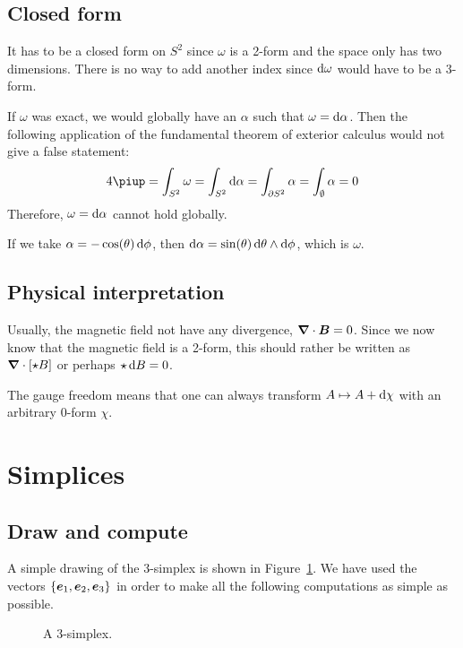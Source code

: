 \documentclass[11pt, english, fleqn, DIV=15, headinclude, BCOR=1cm]{scrartcl}
\begin{document}
\subsection{Closed form}

It has to be a closed form on $S^2$ since $\omega$ is a 2-form and the space
only has two dimensions. There is no way to add another index since $\mathop{}\!\mathrm d
\omega$ would have to be a 3-form.

If $\omega$ was exact, we would globally have an $\alpha$ such that $\omega =
\mathop{}\!\mathrm d\alpha$. Then the following application of the fundamental theorem of
exterior calculus would not give a false statement:
\[
    4 \piup = \int_{S^2} \omega = \int_{S^2} \dif \alpha = \int_{\partial S^2}
    \alpha = \int_\emptyset \alpha = 0
\]
Therefore, $\omega = \mathop{}\!\mathrm d\alpha$ cannot hold globally.

If we take $\alpha = - \cos(\theta) \mathop{}\!\mathrm d \phi$, then $\mathop{}\!\mathrm d \alpha =
\sin(\theta) \mathop{}\!\mathrm d \theta \wedge \mathop{}\!\mathrm d \phi$, which is $\omega$.

\subsection{Physical interpretation}

Usually, the magnetic field not have any divergence, $\boldsymbol{\nabla} \cdot \boldsymbol{B} =
0$. Since we now know that the magnetic field is a 2-form, this should rather
be written as $\boldsymbol{\nabla} \cdot [\star B]$ or perhaps $\star \mathop{}\!\mathrm d B = 0$.

The gauge freedom means that one can always transform $A \mapsto A + \mathop{}\!\mathrm d \chi$
with an arbitrary 0-form $\chi$.

\section{Simplices}
\label{homework:3}

\subsection{Draw and compute}

A simple drawing of the 3-simplex is shown in Figure~\ref{fig:3-simplex}. We
have used the vectors $\{ \boldsymbol{e}_1, \boldsymbol{e}_2, \boldsymbol{e}_3 \}$ in order to make all the
following computations as simple as possible.

\begin{figure}[htbp]
    \centering
    \caption{%
        A 3-simplex.
    }
    \label{fig:3-simplex}
\end{figure}
\end{document}
